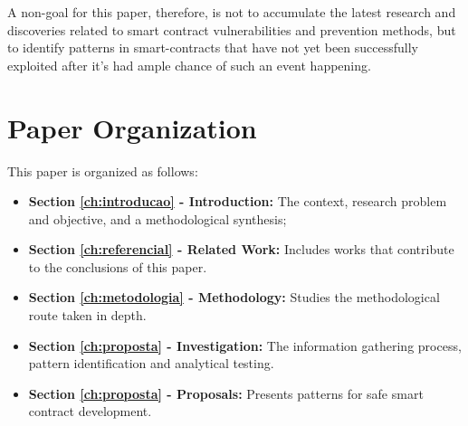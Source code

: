 A non-goal for this paper, therefore, is not to accumulate the latest research and discoveries related to smart contract vulnerabilities and prevention methods, but to identify patterns in smart-contracts that have not yet been successfully exploited after it's had ample chance of such an event happening.

\section{Paper Organization}

This paper is organized as follows:

\begin{itemize}

 \item \textbf{Section \ref{ch:introducao} - Introduction:} The context, research problem and objective, and a methodological synthesis;
 
    \item \textbf{Section \ref{ch:referencial} - Related Work:} Includes works that contribute to the conclusions of this paper.
    
    \item \textbf{Section \ref{ch:metodologia} - Methodology:} Studies the methodological route taken in depth.
       
       
    \item \textbf{Section \ref{ch:proposta} - Investigation:} The information gathering process, pattern identification and analytical testing.
       
       
    \item \textbf{Section \ref{ch:proposta} - Proposals:} Presents patterns for safe smart contract development.

\end{itemize}

